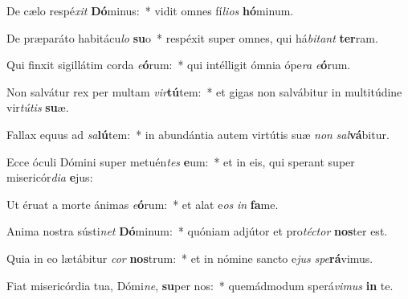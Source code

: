 \item De cælo respé\textit{xit} \textbf{Dó}minus:~* vidit omnes fí\textit{li}\textit{os} \textbf{hó}minum.
\item De præparáto habitácu\textit{lo} \textbf{su}o~* respéxit super omnes, qui há\textit{bi}\textit{tant} \textbf{ter}ram.
\item Qui finxit sigillátim corda \textit{e}\textbf{ó}rum:~* qui intélligit ómnia ópe\textit{ra} \textit{e}\textbf{ó}rum.
\item Non salvátur rex per multam \textit{vir}\textbf{tú}tem:~* et gigas non salvábitur in multitúdine vir\textit{tú}\textit{tis} \textbf{su}æ.
\item Fallax equus ad \textit{sa}\textbf{lú}tem:~* in abundántia autem virtútis suæ \textit{non} \textit{sal}\textbf{vá}bitur.
\item Ecce óculi Dómini super metuén\textit{tes} \textbf{e}um:~* et in eis, qui sperant super misericór\textit{di}\textit{a} \textbf{e}jus:
\item Ut éruat a morte ánimas \textit{e}\textbf{ó}rum:~* et alat e\textit{os} \textit{in} \textbf{fa}me.
\item Anima nostra sústi\textit{net} \textbf{Dó}minum:~* quóniam adjútor et pro\textit{téc}\textit{tor} \textbf{nos}ter est.
\item Quia in eo lætábitur \textit{cor} \textbf{nos}trum:~* et in nómine sancto e\textit{jus} \textit{spe}\textbf{rá}vimus.
\item Fiat misericórdia tua, Dómi\textit{ne}, \textbf{su}per nos:~* quemádmodum sperá\textit{vi}\textit{mus} \textbf{in} te.

